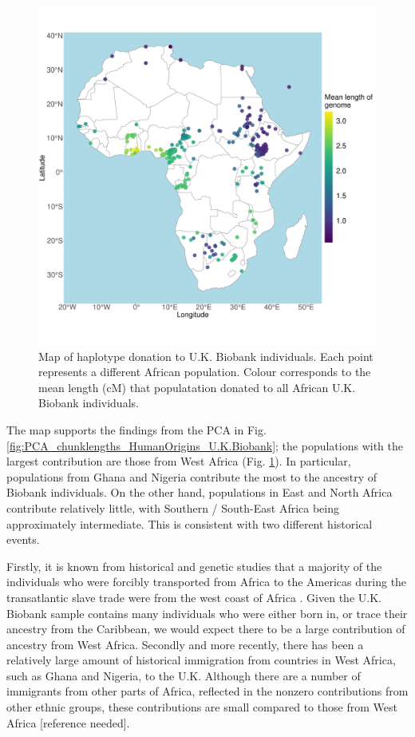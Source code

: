 \begin{figure}[htp]
    \centering
    \includegraphics[width=1.0\textwidth]{../images/chapter3/haplotype_sharing_map.pdf}
    \caption{Map of haplotype donation to U.K. Biobank individuals. Each point represents a different African population. Colour corresponds to the mean length (cM) that populatation donated to all African U.K. Biobank individuals.}
    \label{fig:haplotype_sharing_map_zoomed_II}
\end{figure}

The map supports the findings from the PCA in Fig. \ref{fig:PCA_chunklengths_HumanOrigins_U.K.Biobank}; the populations with the largest contribution are those from West Africa (Fig. \ref{fig:haplotype_sharing_map_zoomed_II}). In particular, populations from Ghana and Nigeria contribute the most to the ancestry of Biobank individuals. On the other hand, populations in East and North Africa contribute relatively little, with Southern / South-East Africa being approximately intermediate. This is consistent with two different historical events. 

Firstly, it is known from historical and genetic studies that a majority of the individuals who were forcibly transported from Africa to the Americas during the transatlantic slave trade were from the west coast of Africa \cite{micheletti2020genetic}. Given the U.K. Biobank sample contains many individuals who were either born in, or trace their ancestry from the Caribbean, we would expect there to be a large contribution of ancestry from West Africa. Secondly and more recently, there has been a relatively large amount of historical immigration from countries in West Africa, such as Ghana and Nigeria, to the U.K. Although there are a number of immigrants from other parts of Africa, reflected in the nonzero contributions from other ethnic groups, these contributions are small compared to those from West Africa [reference needed].

